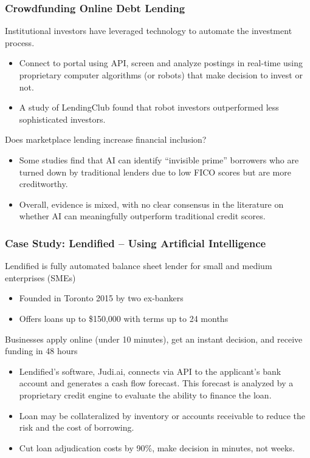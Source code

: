 \documentclass[aspectratio=169,xcolor=dvipsnames]{beamer}
\begin{document}
\begin{frame}
\frametitle{Crowdfunding Online Debt Lending}


Institutional investors have leveraged technology to automate the investment process. 
\begin{itemize}
    \item Connect to portal using API, screen and analyze postings in real-time using proprietary computer algorithms (or robots) that make decision to invest or not.
    \item A study of LendingClub found that robot investors outperformed less sophisticated investors. 
\end{itemize}

\medskip 

Does marketplace lending increase financial inclusion?
\begin{itemize}
    \item Some studies find that AI can identify “invisible prime” borrowers who are turned down by traditional lenders due to low FICO scores but are more creditworthy. 
    \item Overall, evidence is mixed, with no clear consensus in the literature on whether AI can meaningfully outperform traditional credit scores. 
\end{itemize}


\end{frame} 





\begin{frame}
\frametitle{Case Study: Lendified – Using Artificial Intelligence}


Lendified is fully automated balance sheet lender for small and medium enterprises (SMEs)
\begin{itemize}
    \item Founded in Toronto 2015 by two ex-bankers
    \item Offers loans up to \$150,000 with terms up to 24 months
\end{itemize}

\medskip 


Businesses apply online (under 10 minutes), get an instant decision, and receive funding in 48 hours
\begin{itemize}
    \item Lendified’s software, Judi.ai, connects via API to the applicant’s bank account and generates a cash flow forecast. This forecast is analyzed by a proprietary credit engine to evaluate the ability to finance the loan.
    \item Loan may be collateralized by inventory or accounts receivable to reduce the risk and the cost of borrowing.
    \item Cut loan adjudication costs by 90\%, make decision in minutes, not weeks.
\end{itemize}


\end{frame} 
\end{document}
